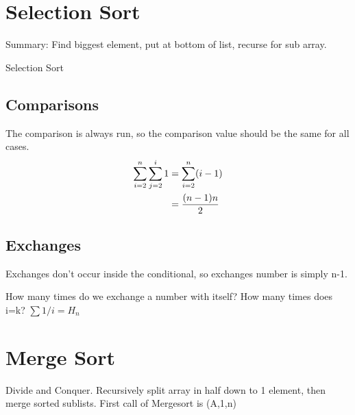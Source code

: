 \documentclass[english, 10pt]{article}
\begin{document}
\section{Selection Sort}
Summary: Find biggest element, put at bottom of list, recurse for sub array.

\begin{algorithm}[H]
    \caption{Selection Sort}
\end{algorithm}

\subsection{Comparisons}
The comparison is always run, so the comparison value should be the same for all cases.
\begin{align*}
    \sum_{i=2}^{n}\sum_{j=2}^{i}1 &= \sum_{i=2}^{n} (i-1) \\
    & = \frac{(n-1)n}{2}\\
\end{align*}

\subsection{Exchanges}
Exchanges don't occur inside the conditional, so exchanges number is simply n-1.

How many times do we exchange a number with itself? How many times does i=k?
$\sum 1/i = H_n$



\section{Merge Sort}
Divide and Conquer. Recursively split array in half down to 1 element, then merge sorted sublists.
First call of Mergesort is (A,1,n) \\
\end{document}
